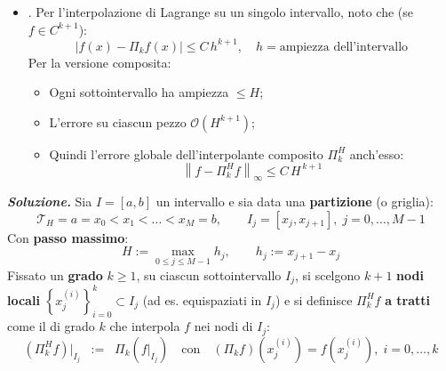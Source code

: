 \begin{enumerate}
\begin{remarkbox}
\begin{itemize}
            \item {}. Per l'interpolazione di Lagrange su un singolo intervallo, \eaccent noto che (se $f \in C^{k+1}$):
            \begin{equation*}
                \left|f(x) - \Pi_{k}f(x)\right| \le C \, h^{k+1}, \quad h = \text{ampiezza dell'intervallo}
            \end{equation*}
            Per la versione composita:
            \begin{itemize}
                \item Ogni sottointervallo ha ampiezza $\le H$;
                \item L'errore su ciascun pezzo \eaccent $\mathcal{O}\left(H^{k+1}\right)$;
                \item Quindi l'errore globale dell'interpolante composito $\Pi_{k}^{H}$ \eaccent anch'esso:
                \begin{equation*}
                    \left\| f - \Pi_{k}^{H} f \right\|_{\infty} \le C \, H^{\,k+1}
                \end{equation*}
            \end{itemize}
        \end{itemize}
    \end{remarkbox}

    \textcolor{Green3}{\textbf{\emph{Soluzione.}}} Sia $I = \left[a,b\right]$ un intervallo e sia data una \textbf{partizione} (o griglia):
    \begin{equation*}
        \mathcal T_H={a=x_0<x_1<\dots<x_M=b}, \qquad I_j=[x_j,x_{j+1}],\; j=0,\dots,M-1
    \end{equation*}
    Con \textbf{passo massimo}:
    \begin{equation*}
        H:=\max_{0\le j\le M-1} h_j, \qquad h_j:=x_{j+1}-x_j
    \end{equation*}
    Fissato un \textbf{grado} $k \ge 1$, su ciascun sottointervallo $I_{j}$, si scelgono $k+1$ \textbf{nodi locali} $\left\{x^{(i)}_j\right\}_{i=0}^k\subset I_j$ (ad es. equispaziati in $I_{j}$) e si definisce $\Pi_{k}^{H} f$ \textbf{a tratti} come il  di grado $k$ che interpola $f$ nei nodi di $I_{j}$:
    \begin{equation*}
        \left(\Pi_k^H f\right)|_{I_j} \;\; := \;\; \Pi_k\left(f|_{I_j}\right)
        \quad\text{con}\quad
        \left(\Pi_k f\right)\left(x^{(i)}_j\right)=f\left(x^{(i)}_j\right),\; i=0,\dots,k
    \end{equation*}


\end{enumerate}
